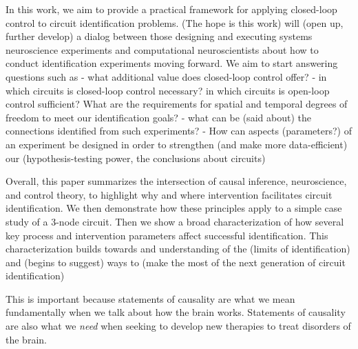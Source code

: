 In this work, we aim to provide a practical framework for applying closed-loop control to circuit identification problems. (The hope is this work) will (open up, further develop) a dialog between those designing and executing systems neuroscience experiments and computational neuroscientists about how to conduct identification experiments moving forward. We aim to start answering questions such as
- what additional value does closed-loop control offer?
- in which circuits is closed-loop control necessary? in which circuits is open-loop control sufficient? What are the requirements for spatial and temporal degrees of freedom to meet our identification goals?
- what can be (said about) the connections identified from such experiments?
- How can aspects (parameters?) of an experiment be designed in order to strengthen (and make more data-efficient) our (hypothesis-testing power, the conclusions about circuits)

Overall, this paper summarizes the intersection of causal inference, neuroscience, and control theory, to highlight why and where intervention facilitates circuit identification. We then demonstrate how these principles apply to a simple case study of a 3-node circuit. Then we show a broad characterization of how several key process and intervention parameters affect successful identification. This characterization builds towards and understanding of the (limits of identification) and (begins to suggest) ways to (make the most of the next generation of circuit identification)

This is important because statements of causality are what we mean fundamentally when we talk about how the brain works. Statements of causality are also what we \textit{need} when seeking to develop new therapies to treat disorders of the brain.
